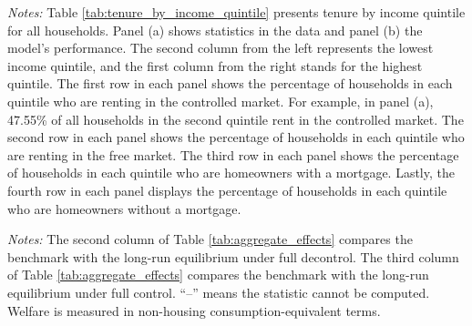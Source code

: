 \documentclass[parskip=full]{article}
\newenvironment{fignote2}[1]
{
\par
\medskip
\begin{minipage}{#1}
\footnotesize
}
{
\end{minipage}
}
\begin{document}
\begin{table}[H]
    \centering
    \caption{Tenure by income quintile for working-age households in benchmark}
    \vspace{-0.5cm}
    \label{tab:tenure_by_income_quintile}    
    
    \vspace{-0.45cm}
    \begin{fignote2}{0.66\textwidth}
      \textit{Notes:} Table \ref{tab:tenure_by_income_quintile} presents tenure by income quintile for all households. Panel (a) shows statistics in the data and panel (b) the model's performance. The second column from the left represents the lowest income quintile, and the first column from the right stands for the highest quintile. The first row in each panel shows the percentage of households in each quintile who are renting in the controlled market. For example, in panel (a), 47.55\% of all households in the second quintile rent in the controlled market. The second row in each panel shows the percentage of households in each quintile who are renting in the free market. The third row in each panel shows the percentage of households in each quintile who are homeowners with a mortgage. Lastly, the fourth row in each panel displays the percentage of households in each quintile who are homeowners without a mortgage.
    \end{fignote2}
\end{table}

\begin{table}[H]
    \centering
    \caption{Aggregate effects}
    \vspace{-0.5cm}
    \label{tab:aggregate_effects}
    
    \vspace{-0.45cm}
    \begin{fignote2}{0.67\textwidth}
      \textit{Notes:} The second column of Table \ref{tab:aggregate_effects} compares the benchmark with the long-run equilibrium under full decontrol. The third column of Table \ref{tab:aggregate_effects} compares the benchmark with the long-run equilibrium under full control. “--” means the statistic cannot be computed. Welfare is measured in non-housing consumption-equivalent terms.
    \end{fignote2}
\end{table}
\end{document}
